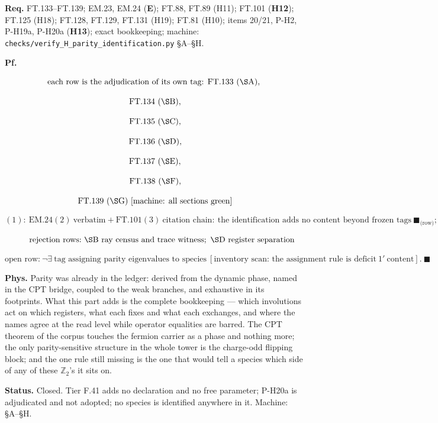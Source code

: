 \documentclass[11pt,openany]{report}
\theoremstyle{canonplain}
\theoremstyle{canondef}
\begin{document}
\textbf{Req.} FT.133–FT.139; EM.23, EM.24 (\textbf{E}); FT.88, FT.89 (H11); FT.101 (\textbf{H12}); FT.125 (H18); FT.128, FT.129, FT.131 (H19); FT.81 (H10); items 20/21, P-H2, P-H19a, P-H20a (\textbf{H13}); exact bookkeeping; machine: \texttt{checks/\allowbreak{}verify\_\allowbreak{}H\_\allowbreak{}parity\_\allowbreak{}identification.py} §A–§H.

\textbf{Pf.}

\[
\text{each row is the adjudication of its own tag: FT.133}\ (\S\mathrm{A}),
\]

\[
\ \text{FT.134}\ (\S\mathrm{B}),
\]

\[
\ \text{FT.135}\ (\S\mathrm{C}),
\]

\[
\ \text{FT.136}\ (\S\mathrm{D}),
\]

\[
\ \text{FT.137}\ (\S\mathrm{E}),
\]

\[
\ \text{FT.138}\ (\S\mathrm{F}),
\]

\[
\ \text{FT.139}\ (\S\mathrm{G})\ [\text{machine: all sections green}]
\]

\[
(1):\ \mathrm{EM.24}(2)\ \text{verbatim}+\mathrm{FT.101}(3)\ \text{citation chain}:\ \text{the identification adds no content beyond frozen tags}\ \blacksquare_{\text{(row)}};
\]

\[
\qquad \text{rejection rows:}\ \S\mathrm{B}\ \text{ray census and trace witness};\ \S\mathrm{D}\ \text{register separation}
\]

\[
\text{open row:}\ \neg\exists\ \text{tag assigning parity eigenvalues to species}\ [\text{inventory scan: the assignment rule is deficit}\ 1'\ \text{content}].\ \blacksquare
\]

\textbf{Phys.} Parity was already in the ledger: derived from the dynamic phase, named in the CPT bridge, coupled to the weak branches, and exhaustive in its footprints. What this part adds is the complete bookkeeping — which involutions act on which registers, what each fixes and what each exchanges, and where the names agree at the read level while operator equalities are barred. The CPT theorem of the corpus touches the fermion carrier as a phase and nothing more; the only parity-sensitive structure in the whole tower is the charge-odd flipping block; and the one rule still missing is the one that would tell a species which side of any of these $\mathbb{Z}$$_2$'s it sits on.

\textbf{Status.} Closed. Tier F.41 adds no declaration and no free parameter; P-H20a is adjudicated and not adopted; no species is identified anywhere in it. Machine: §A–§H.
\end{document}
